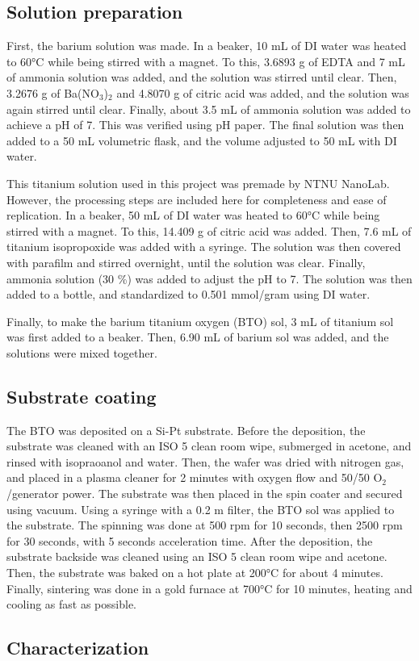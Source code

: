 \subsection{Solution preparation}

First, the barium solution was made.
In a beaker, 10 mL of DI water was heated to 60°C while being stirred with a magnet.
To this, 3.6893 g of EDTA and 7 mL of ammonia solution was added, and the solution was stirred until clear.
Then, 3.2676 g of Ba(NO$_3$)$_2$ and 4.8070 g of citric acid was added, and the solution was again stirred until clear.
Finally, about 3.5 mL of ammonia solution was added to achieve a pH of 7. 
This was verified using pH paper.
The final solution was then added to a 50 mL volumetric flask, and the volume adjusted to 50 mL with DI water.


This titanium solution used in this project was premade by NTNU NanoLab.
However, the processing steps are included here for completeness and ease of replication.
In a beaker, 50 mL of DI water was heated to 60°C while being stirred with a magnet.
To this, 14.409 g of citric acid was added.
Then, 7.6 mL of titanium isopropoxide was added with a syringe.
The solution was then covered with parafilm and stirred overnight, until the solution was clear.
Finally, ammonia solution (30 \%) was added to adjust the pH to 7.
The solution was then added to a bottle, and standardized to 0.501 mmol/gram using DI water.

Finally, to make the barium titanium oxygen (BTO) sol, 3 mL of titanium sol was first added to a beaker. 
Then, 6.90 mL of barium sol was added, and the solutions were mixed together.

\subsection{Substrate coating}

The BTO was deposited on a Si-Pt substrate.
Before the deposition, the substrate was cleaned with an ISO 5 clean room wipe, submerged in acetone, and rinsed with isopraoanol and water.
Then, the wafer was dried with nitrogen gas, and placed in a plasma cleaner for 2 minutes with oxygen flow and 50/50 O$_2$/generator power.
The substrate was then placed in the spin coater and secured using vacuum.
Using a syringe with a 0.2 \textmu m filter, the BTO sol was applied to the substrate.
The spinning was done at 500 rpm for 10 seconds, then 2500 rpm for 30 seconds, with 5 seconds acceleration time.
After the deposition, the substrate backside was cleaned using an ISO 5 clean room wipe and acetone.
Then, the substrate was baked on a hot plate at 200°C for about 4 minutes.
Finally, sintering was done in a gold furnace at 700°C for 10 minutes, heating and cooling as fast as possible.

\subsection{Characterization}

